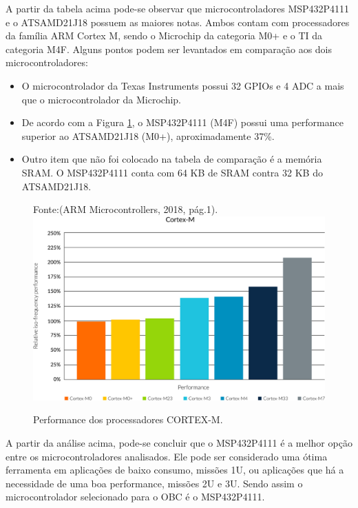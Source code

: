 A partir da tabela acima pode-se observar que microcontroladores MSP432P4111 e o ATSAMD21J18 possuem as maiores notas. Ambos contam com processadores da família ARM Cortex M, sendo o Microchip da categoria M0+ e o TI da categoria M4F. Alguns pontos podem ser levantados em comparação aos dois microcontroladores:

\begin{itemize}
	\item O microcontrolador da Texas Instruments possui 32 GPIOs e 4 ADC a mais que o microcontrolador da Microchip.
	
	\item De acordo com a Figura \ref{fig18}, o MSP432P4111 (M4F) possui uma performance superior ao ATSAMD21J18 (M0+), aproximadamente 37\%.
	
	\item Outro item que não foi colocado na tabela de comparação é a memória SRAM. O MSP432P4111 conta com 64 KB de SRAM contra 32 KB do ATSAMD21J18.
	
\end{itemize}


\begin{figure}[h]
\footnotesize{	
	\centering
	Fonte:(ARM Microcontrollers, 2018, pág.1).
	\includegraphics[keepaspectratio=true,scale=0.4]{figuras/arm-cortex-m-series-performance-graph.jpg}
	\caption{ Performance dos processadores CORTEX-M.}
	
	
	\label{fig18}
}
\end{figure}
\FloatBarrier

A partir da análise acima, pode-se concluir que o MSP432P4111 é a melhor opção entre os microcontroladores analisados. Ele pode ser considerado uma ótima ferramenta em aplicações de baixo consumo, missões 1U, ou aplicações que há a necessidade de uma boa performance, missões 2U e 3U. Sendo assim o microcontrolador selecionado para o OBC é o MSP432P4111.

